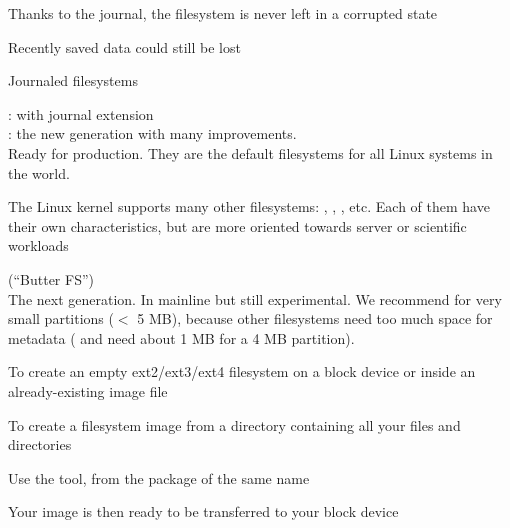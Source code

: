     \startitemize
    \item Thanks to the journal, the filesystem is never left in a
      corrupted state
    \item Recently saved data could still be lost
    \stopitemize

  Journaled filesystems
  \startitemize
  \item {}:  with journal extension\\
    : the new generation with many improvements.\\
    Ready for production. They are the default filesystems for all
    Linux systems in the world.
  \item The Linux kernel supports many other filesystems:
    , , , etc.  Each of them have
    their own characteristics, but are more oriented towards server or
    scientific workloads
  \item {} (``Butter FS'')\\
    The next generation. In mainline but still experimental.
  \stopitemize
  We recommend  for very small partitions ($<$ 5 MB),
  because other filesystems need too much space for metadata
  ( and  need about 1 MB for a 4 MB partition). 

  \startitemize
  \item To create an empty ext2/ext3/ext4 filesystem on a block device or
    inside an already-existing image file
    \startitemize
    \item {}
    \item {}
    \item {}
    \item {}
    \stopitemize
  \item To create a filesystem image from a directory containing all
    your files and directories
    \startitemize
    \item Use the  tool, from the package of the same name
    \item {}
    \item Your image is then ready to be transferred to your block
      device
    \stopitemize
  \stopitemize

